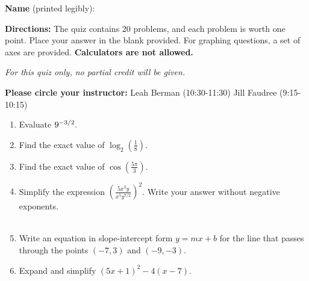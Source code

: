 \documentclass[12pt]{article}
\begin{document}
\textbf{Name} (printed legibly): \fbox{\strut\hspace{4in} }

\textbf{Directions:} The quiz contains 20 problems, and each problem is worth one point. Place your answer in the blank provided. For graphing questions, a set of axes are provided. {\bf Calculators are not allowed.}%

{\em For this quiz only, no partial credit will be given.}

\textbf{Please circle your instructor:} \hspace{.25in} Leah Berman (10:30-11:30)  \hspace{.25in}  Jill Faudree (9:15-10:15)
\begin{enumerate}
\item Evaluate ${\large{9^{-3/2}}}.$

\quad \hfill \underline{\hspace{2in}}
\vfill

\item Find the exact value of  ${\displaystyle{\log_{2}\left({\frac{1}{8}}\right)}}.$

\quad \hfill \underline{\hspace{2in}}
\vfill

\item Find the exact value of $\displaystyle{\cos \left(\frac{ 5 \pi}{ 3}\right)}.$

\quad \hfill \underline{\hspace{2in}}
\vfill

\item  Simplify the expression $\displaystyle{\left(\frac{5x^{2}y}{x^5y^{7/2}} \right)^2}$. Write your answer without negative exponents.\\
\quad \\

\quad \hfill \underline{\hspace{2in}}
\vfill

\item Write an equation in slope-intercept form $y=mx+b$ for the line that passes through the points $(-7,3)$ and $(-9,-3)$.\\

\quad \hfill \underline{\hspace{2in}}
\vfill
\newpage

\item Expand and simplify $(5x+1)^2-4(x-7).$\\


\end{enumerate}
\end{document}

